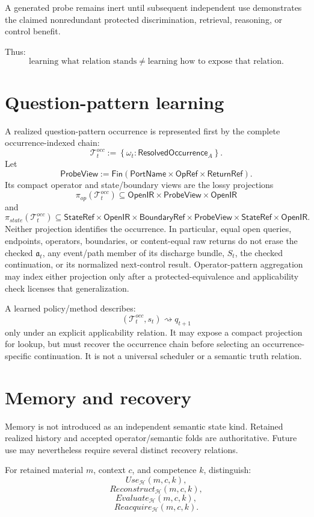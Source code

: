 \documentclass[11pt,oneside]{article}
\newcommand{\OpenIR}{\mathsf{OpenIR}}
\newcommand{\StateRef}{\mathsf{StateRef}}
\newcommand{\ReturnRef}{\mathsf{ReturnRef}}
\newcommand{\OpRef}{\mathsf{OpRef}}
\newcommand{\BoundaryRef}{\mathsf{BoundaryRef}}
\newcommand{\AskRef}{\mathfrak a}
\begin{document}
A generated probe remains inert until subsequent independent use demonstrates the claimed nonredundant protected discrimination, retrieval, reasoning, or control benefit.

Thus:
\[
\boxed{
\text{learning what relation stands}
\neq
\text{learning how to expose that relation}.
}
\]

\section{Question-pattern learning}

A realized question-pattern occurrence is represented first by the complete occurrence-indexed
chain:
\[
\boxed{
\mathcal T_t^{occ}
:=
\left\{
\omega_t:\mathsf{ResolvedOccurrence}_A
\right\}.
}
\]
Let
\[
\mathsf{ProbeView}:=
\mathsf{Fin}(\mathsf{PortName}\times\OpRef\times\ReturnRef).
\]
Its compact operator and state/boundary views are the lossy projections
\[
\pi_{op}(\mathcal T_t^{occ})
\subseteq
\OpenIR
\times\mathsf{ProbeView}
\times\OpenIR
\]
and
\[
\pi_{state}(\mathcal T_t^{occ})
\subseteq
\StateRef
\times
\OpenIR
\times
\BoundaryRef
\times
\mathsf{ProbeView}
\times
\StateRef
\times
\OpenIR.
\]
Neither projection identifies the occurrence.  In particular, equal open queries, endpoints,
operators, boundaries, or content-equal raw returns do not erase the checked \(\AskRef_t\), any
event/path member of its discharge bundle, \(\widehat S_t\), the checked continuation, or its
normalized next-control result.  Operator-pattern aggregation may
index either projection only after a protected-equivalence and applicability check licenses that
generalization.

A learned policy/method describes:
\[
(\mathcal T_t^{occ},s_t)\rightsquigarrow q_{t+1}
\]
only under an explicit applicability relation.  It may expose a compact projection for lookup, but
must recover the occurrence chain before selecting an occurrence-specific continuation.  It is not
a universal scheduler or a semantic truth relation.

\section{Memory and recovery}

Memory is not introduced as an independent semantic state kind.  Retained realized history and accepted operator/semantic folds are authoritative.  Future use may nevertheless require several distinct recovery relations.

For retained material \(m\), context \(c\), and competence \(k\), distinguish:
\[
Use_{\mathcal H}(m,c,k),
\]
\[
Reconstruct_{\mathcal H}(m,c,k),
\]
\[
Evaluate_{\mathcal H}(m,c,k),
\]
\[
Reacquire_{\mathcal H}(m,c,k).
\]
\end{document}
